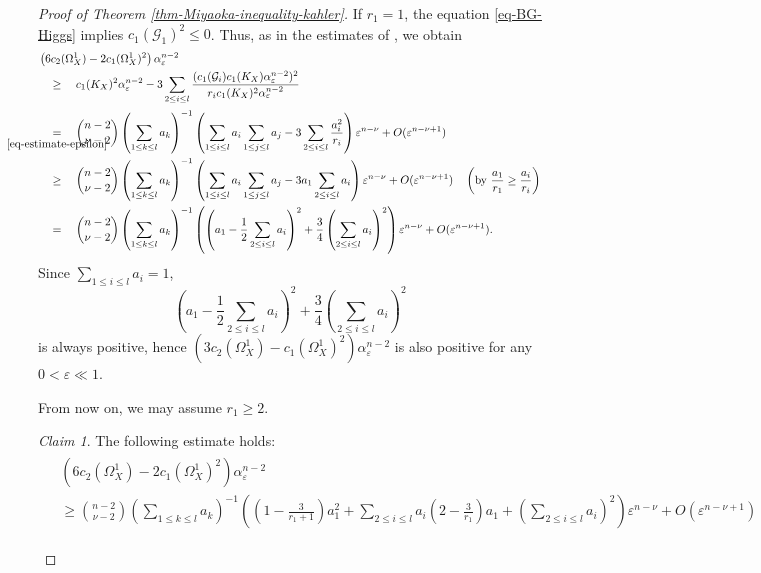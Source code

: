 \documentclass[12pt]{amsart}
\theoremstyle{definition}
\theoremstyle{remark}
\newtheorem{claim}[thm]{Claim}
\numberwithin{equation}{section}
\newcommand{\underalign}[2]{\quad \underset{\mathclap{\strut #1}}{#2}\quad}
\begin{document}
\begin{proof}[Proof of Theorem \ref{thm-Miyaoka-inequality-kahler}]
If $r_1 =1$, the equation \eqref{eq-BG-Higgs} implies $c_{1}(\mathcal{G}_1)^{2} \le 0$. Thus, as in the estimates of \cite[p.25]{IM22}, we obtain 
\begin{align*}
\begin{split}
&\left(6c_2(\Omega_{X}^{1}) - 2 c_1(\Omega_{X}^{1})^2 \right)\alpha_{ \varepsilon }^{n-2} \\
&\underalign{}{\ge} 
c_1(K_X)^2\alpha_{ \varepsilon }^{n-2} - 3\sum_{2\le i\le l}\frac{(c_1(\mathcal{G}_i)c_1(K_X) \alpha_{ \varepsilon }^{n-2})^2}{r_ic_1(K_X)^2 \alpha_{ \varepsilon }^{n-2}}  \\
& \underalign{\eqref{eq-estimate-epsilon}}{=}
 \binom{n-2}{\nu-2} \left(\sum_{1\le k\le l} a_k \right)^{-1}
\left(\sum_{1\le i\le l} a_i \sum_{1\le j\le l} a_j - 3\sum_{2\le i\le l} \frac{a_{i}^{2}}{r_i} \right)\varepsilon ^{n-\nu}
+ O( \varepsilon ^{n-\nu+1}) \\
&\underalign{}{ \ge}
\binom{n-2}{\nu-2} \left(\sum_{1\le k\le l} a_k \right)^{-1}
\left(\sum_{1\le i\le l} a_i \sum_{1\le j\le l} a_j - 3a_1\sum_{2\le i\le l} a_i \right)\varepsilon ^{n-\nu}
+ O( \varepsilon ^{n-\nu+1})  \quad \left(\text{by } \frac{a_1}{r_1} \ge \frac{a_i}{r_i}\right)
\\
 &\underalign{}{=}
 \binom{n-2}{\nu-2} \left(\sum_{1\le k\le l} a_k \right)^{-1}
\left(\left(a_1 -\frac{1}{2} \sum_{2\le i\le l} a_i \right)^{2} + \frac{3}{4} \left(\sum_{2\le i\le l} a_i \right)^{2} \right)\varepsilon ^{n-\nu}
+ O( \varepsilon ^{n-\nu+1}).
 \end{split}
\end{align*}
Since $\sum_{1 \le i \le l}a_i =1$, 
$$\left(a_1 -\frac{1}{2} \sum_{2\le i\le l} a_i \right)^{2} + \frac{3}{4} \left(\sum_{2\le i\le l} a_i \right)^{2}
$$
 is always positive, hence $\left(3c_2(\Omega_{X}^{1}) - c_1(\Omega_{X}^{1})^2 \right)\alpha_{ \varepsilon }^{n-2} $ is also positive for any $0 < \varepsilon \ll 1$.

From now on, we may assume $r_1 \ge 2$.

\begin{claim}
\label{claim_kalher_inequality}
The following estimate holds:
\begin{align*}
\begin{split}
& \left(6c_2(\Omega_{X}^{1}) - 2 c_1(\Omega_{X}^{1})^2 \right)\alpha_{ \varepsilon }^{n-2}  \\ 
&\ge \binom{n-2}{\nu-2} \left(\sum_{1\le k\le l} a_k \right)^{-1}
\left( \left(1 - \frac{3}{r_1 + 1} \right) a_{1}^{2}
+ \sum_{2\le i\le l} a_i \left(2 - \frac{3}{r_1} \right) a_{1}
+\left(\sum_{2\le i\le l} a_i \right)^2 \right)\varepsilon ^{n-\nu} + O( \varepsilon ^{n-\nu+1}) 
 \end{split}
 \end{align*}
 

\end{claim}
\end{proof}
\end{document}
